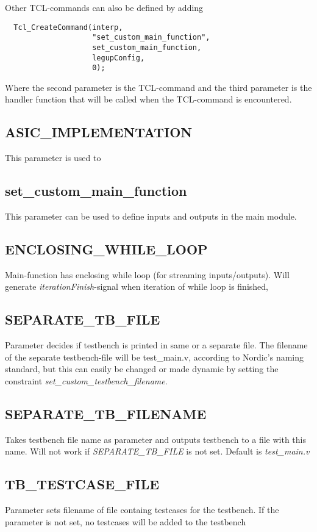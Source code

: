 Other TCL-commands can also be defined by adding 
\begin{verbatim}
  Tcl_CreateCommand(interp,
                    "set_custom_main_function",
                    set_custom_main_function,
                    legupConfig,
                    0);
\end{verbatim}
Where the second parameter is the TCL-command and the third parameter is the handler function that will be called when the TCL-command is encountered.

\subsection{ASIC\_IMPLEMENTATION}
This parameter is used to 



\subsection{set\_custom\_main\_function}
This parameter can be used to define inputs and outputs in the main module. 
\subsection{ENCLOSING\_WHILE\_LOOP}
Main-function has enclosing while loop (for streaming inputs/outputs). Will generate \textit{iterationFinish}-signal when iteration of while loop is finished,
\subsection{SEPARATE\_TB\_FILE}
Parameter decides if testbench is printed in same or a separate file. The filename of the separate testbench-file will be test\_main.v, according to Nordic's naming standard, but this can easily be changed or made dynamic by setting the constraint \textit{set\_custom\_testbench\_filename}.
\subsection{SEPARATE\_TB\_FILENAME}
Takes testbench file name as parameter and outputs testbench to a file with this name. Will not work if \textit{SEPARATE\_TB\_FILE} is not set. Default is \textit{test\_main.v}
\subsection{TB\_TESTCASE\_FILE}
Parameter sets filename of file containg testcases for the testbench. If the parameter is not set, no testcases will be added to the testbench
